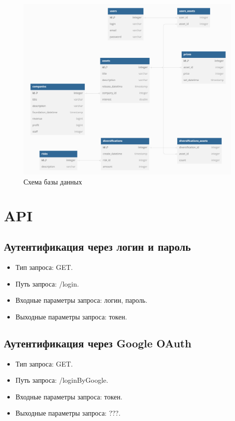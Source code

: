\documentclass[a4paper, 14pt]{article}
\begin{document}
\begin{figure}[H]
    \centering
    \includegraphics[width=17cm]{resources/14.png}
    \caption{Схема базы данных}
\end{figure}

\section{API}

\subsection{Аутентификация через логин и пароль}

\begin{itemize}
    \item Тип запроса: GET.
    \item Путь запроса: /login.
    \item Входные параметры запроса: логин, пароль.
    \item Выходные параметры запроса: токен.
\end{itemize}

\subsection{Аутентификация через Google OAuth}

\begin{itemize}
    \item Тип запроса: GET.
    \item Путь запроса: /loginByGoogle.
    \item Входные параметры запроса: токен.
    \item Выходные параметры запроса: ???.
\end{itemize}
\end{document}

